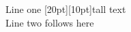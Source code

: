 \documentclass[12pt]{article}
\begin{document}
Line one \raisebox{0pt}[20pt][10pt]{tall} text\\
Line two follows here
\end{document}
